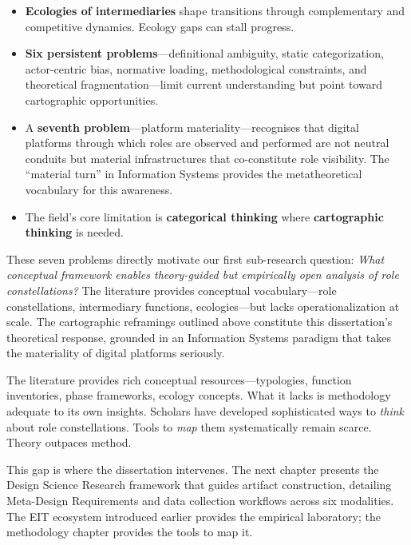 \documentclass[../main.tex]{subfiles}
\begin{document}
\begin{summarybox}
\begin{itemize}[leftmargin=*, itemsep=0.3em]
\item \textbf{Ecologies of intermediaries} shape transitions through complementary and competitive dynamics. Ecology gaps can stall progress.

\item \textbf{Six persistent problems}---definitional ambiguity, static categorization, actor-centric bias, normative loading, methodological constraints, and theoretical fragmentation---limit current understanding but point toward cartographic opportunities.

\item A \textbf{seventh problem}---platform materiality---recognises that digital platforms through which roles are observed and performed are not neutral conduits but material infrastructures that co-constitute role visibility. The ``material turn'' in Information Systems provides the metatheoretical vocabulary for this awareness.

\item The field's core limitation is \textbf{categorical thinking} where \textbf{cartographic thinking} is needed.
\end{itemize}

\noindent These seven problems directly motivate our first sub-research question: \textit{What conceptual framework enables theory-guided but empirically open analysis of role constellations?} The literature provides conceptual vocabulary---role constellations, intermediary functions, ecologies---but lacks operationalization at scale. The cartographic reframings outlined above constitute this dissertation's theoretical response, grounded in an Information Systems paradigm that takes the materiality of digital platforms seriously.
\end{summarybox}

\vspace{1em}

The literature provides rich conceptual resources---typologies, function inventories, phase frameworks, ecology concepts. What it lacks is methodology adequate to its own insights. Scholars have developed sophisticated ways to \emph{think} about role constellations. Tools to \emph{map} them systematically remain scarce. Theory outpaces method.

This gap is where the dissertation intervenes. The next chapter presents the Design Science Research framework that guides artifact construction, detailing Meta-Design Requirements and data collection workflows across six modalities. The EIT ecosystem introduced earlier provides the empirical laboratory; the methodology chapter provides the tools to map it.
\end{document}
